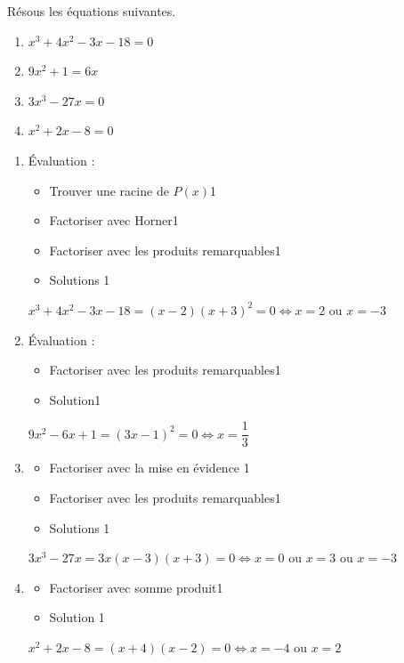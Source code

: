 \documentclass[../partie1.tex]{subfiles}
\begin{document}
\begin{exercise}[points=11]
    Résous les équations suivantes.
    \begin{enumerate}[cols=2]
        \item %
              $x^{3}+4x^{2}-3x -18=0$
        \item %
              $9x^{2}+1=6x$
        \item %
              $3x^{3}-27x=0$
        \item %
              $x^{2}+2x-8 =0$
    \end{enumerate}
\end{exercise}
\begin{solution}
    \begin{enumerate}
        \item Évaluation : 
        \begin{itemize}
            \item Trouver une racine de $P(x)$\hfill 1
            \item Factoriser avec Horner\hfill 1
            \item Factoriser avec les produits remarquables\hfill 1
            \item Solutions \hfill 1 
        \end{itemize} 
        $x^{3}+4x^{2}-3x -18 = (x-2)(x+3)^2=0 \Leftrightarrow x = 2\text{~ou~} x= -3$
        
        \item Évaluation :
        \begin{itemize}
            \item Factoriser avec les produits remarquables\hfill 1
            \item Solution\hfill 1
        \end{itemize}
        $9x^2-6x+1 = (3x-1)^2 =0\Leftrightarrow x = \dfrac{1}{3}$

        \item 
        \begin{itemize}
            \item Factoriser avec la mise en évidence \hfill 1
            \item Factoriser avec les produits remarquables\hfill 1
            \item Solutions \hfill 1
        \end{itemize}
        $3x^3-27x = 3x(x-3)(x+3)=0 \Leftrightarrow x=0 \text{~ou~}x=3\text{~ou~}x=-3$
        
        \item 
        \begin{itemize}
            \item Factoriser avec somme produit\hfill 1
            \item Solution \hfill 1
        \end{itemize}
        $x^2+2x-8 = (x+4)(x-2) = 0\Leftrightarrow x=-4 \text{~ou~}x=2$
    \end{enumerate}
\end{solution}
\end{document}
